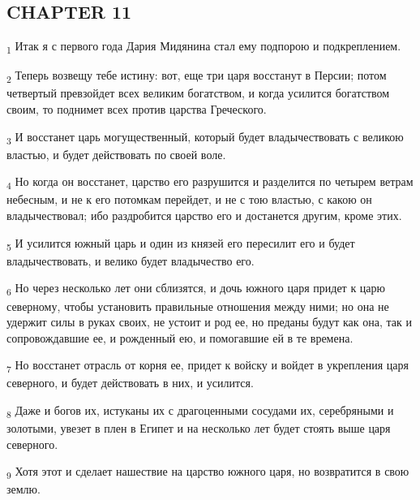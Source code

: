 \subsection{CHAPTER 11}
\begin{tcolorbox}
\textsubscript{1} Итак я с первого года Дария Мидянина стал ему подпорою и подкреплением.
\end{tcolorbox}
\begin{tcolorbox}
\textsubscript{2} Теперь возвещу тебе истину: вот, еще три царя восстанут в Персии; потом четвертый превзойдет всех великим богатством, и когда усилится богатством своим, то поднимет всех против царства Греческого.
\end{tcolorbox}
\begin{tcolorbox}
\textsubscript{3} И восстанет царь могущественный, который будет владычествовать с великою властью, и будет действовать по своей воле.
\end{tcolorbox}
\begin{tcolorbox}
\textsubscript{4} Но когда он восстанет, царство его разрушится и разделится по четырем ветрам небесным, и не к его потомкам перейдет, и не с тою властью, с какою он владычествовал; ибо раздробится царство его и достанется другим, кроме этих.
\end{tcolorbox}
\begin{tcolorbox}
\textsubscript{5} И усилится южный царь и один из князей его пересилит его и будет владычествовать, и велико будет владычество его.
\end{tcolorbox}
\begin{tcolorbox}
\textsubscript{6} Но через несколько лет они сблизятся, и дочь южного царя придет к царю северному, чтобы установить правильные отношения между ними; но она не удержит силы в руках своих, не устоит и род ее, но преданы будут как она, так и сопровождавшие ее, и рожденный ею, и помогавшие ей в те времена.
\end{tcolorbox}
\begin{tcolorbox}
\textsubscript{7} Но восстанет отрасль от корня ее, придет к войску и войдет в укрепления царя северного, и будет действовать в них, и усилится.
\end{tcolorbox}
\begin{tcolorbox}
\textsubscript{8} Даже и богов их, истуканы их с драгоценными сосудами их, серебряными и золотыми, увезет в плен в Египет и на несколько лет будет стоять выше царя северного.
\end{tcolorbox}
\begin{tcolorbox}
\textsubscript{9} Хотя этот и сделает нашествие на царство южного царя, но возвратится в свою землю.
\end{tcolorbox}
